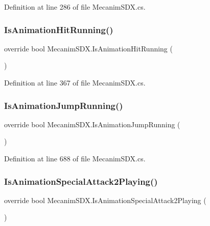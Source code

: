 Definition at line 286 of file Mecanim\+S\+D\+X.\+cs.

\mbox{\label{class_mecanim_s_d_x_ae88c927c3af0445cfaf3e7620a518df2}} 
\subsubsection{\texorpdfstring{IsAnimationHitRunning()}{IsAnimationHitRunning()}}
{\footnotesize\ttfamily override bool Mecanim\+S\+D\+X.\+Is\+Animation\+Hit\+Running (\begin{DoxyParamCaption}{ }\end{DoxyParamCaption})}



Definition at line 367 of file Mecanim\+S\+D\+X.\+cs.

\mbox{\label{class_mecanim_s_d_x_adc5e56049f87610dfc59071c22d63718}} 
\subsubsection{\texorpdfstring{IsAnimationJumpRunning()}{IsAnimationJumpRunning()}}
{\footnotesize\ttfamily override bool Mecanim\+S\+D\+X.\+Is\+Animation\+Jump\+Running (\begin{DoxyParamCaption}{ }\end{DoxyParamCaption})}



Definition at line 688 of file Mecanim\+S\+D\+X.\+cs.

\mbox{\label{class_mecanim_s_d_x_a8d61341c1b126e94156629faba4e2683}} 
\subsubsection{\texorpdfstring{IsAnimationSpecialAttack2Playing()}{IsAnimationSpecialAttack2Playing()}}
{\footnotesize\ttfamily override bool Mecanim\+S\+D\+X.\+Is\+Animation\+Special\+Attack2\+Playing (\begin{DoxyParamCaption}{ }\end{DoxyParamCaption})}



